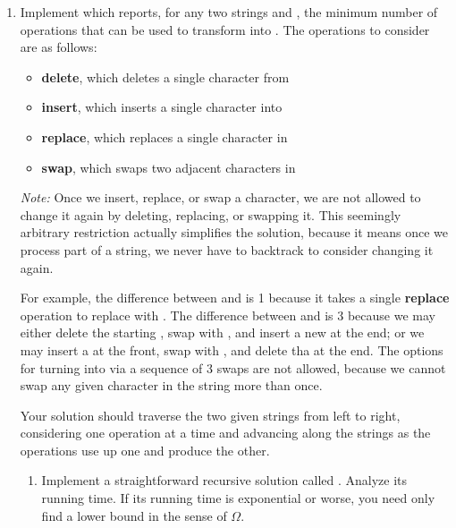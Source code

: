 \documentclass{article}
\begin{document}
\begin{enumerate}

  \newpage
  \item Implement  which reports, for any two strings
     and , the minimum number of operations that can be used
    to transform  into .  The operations to consider are as
    follows:
    \begin{itemize}
    \item \textbf{delete}, which deletes a single character from 
    \item \textbf{insert}, which inserts a single character into 
    \item \textbf{replace}, which replaces a single character in 
    \item \textbf{swap}, which swaps two adjacent characters in 
    \end{itemize}
    \emph{Note:} Once we insert, replace, or swap a character, we are not
    allowed to change it again by deleting, replacing, or swapping it.  This
    seemingly arbitrary restriction actually simplifies the solution, because it
    means once we process part of a string, we never have to backtrack to
    consider changing it again.

    For example, the difference between  and  is 1
    because it takes a single \textbf{replace} operation to replace 
    with .  The difference between  and  is 3
    because we may either delete the starting , swap  with
    , and insert a new  at the end; or we may insert a
     at the front, swap  with , and delete tha
     at the end.  The options for turning  into
     via a sequence of 3 swaps are not allowed, because we cannot
    swap any given character in the string more than once.

    Your solution should traverse the two given strings from left to right,
    considering one operation at a time and advancing along the strings as the
    operations use up one and produce the other.

    \begin{enumerate}

    \item Implement a straightforward recursive solution called
      .  Analyze its running time.  If its running
      time is exponential or worse, you need only find a lower bound in the
      sense of \(\Omega\).


\end{enumerate}
\end{enumerate}
\end{document}
